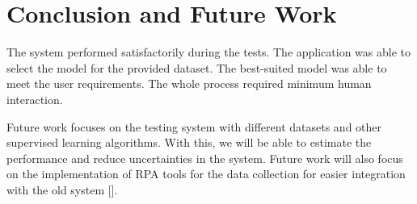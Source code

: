 \section{Conclusion and Future Work}\label{sec:conclusion_and_futur_work}

The system performed satisfactorily during the tests. The application was able to select the model for the provided dataset. The best-suited model was able to meet the user requirements. The whole process required minimum human interaction.

Future work focuses on the testing system with different datasets and other supervised learning algorithms. With this, we will be able to estimate the performance and reduce uncertainties in the system. Future work will also focus on the implementation of RPA tools for the data collection for easier integration with the old system [].